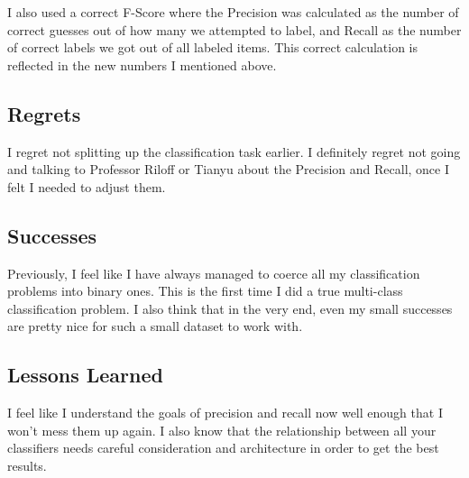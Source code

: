 \documentclass{article}
\begin{document}
I also used a correct F-Score where the Precision was calculated as the number of correct guesses out of how many we attempted to label, and Recall as the number of correct labels we got out of all labeled items. This correct calculation is reflected in the new numbers I mentioned above. 

\subsection{Regrets}

I regret not splitting up the classification task earlier. I definitely regret not going and talking to Professor Riloff or Tianyu about the Precision and Recall, once I felt I needed to adjust them. 
\subsection{Successes}
Previously, I feel like I have always managed to coerce all my classification problems into binary ones. This is the first time I did a true multi-class classification problem. I also think that in the very end, even my small successes are pretty nice for such a small dataset to work with. 
 \subsection{Lessons Learned}
I feel like I understand the goals of precision and recall now well enough that I won't mess them up again. I also know that the relationship between all your classifiers needs careful consideration and architecture in order to get the best results. 

	
\end{document}
